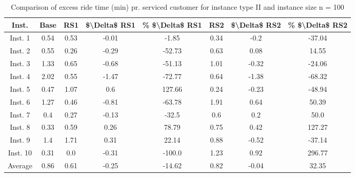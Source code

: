 \begin{table}[H]
\centering
\begin{tabular}{cccccccc}
  \hline
  \textbf{Inst.} & \textbf{Base} & \textbf{RS1} & \textbf{\$\textbackslash{}Delta\$  RS1} & \textbf{\% \$\textbackslash{}Delta\$  RS1} & \textbf{RS2} & \textbf{\$\textbackslash{}Delta\$  RS2} & \textbf{\% \$\textbackslash{}Delta\$  RS2} \\\hline
  Inst. 1 & 0.54 & 0.53 & -0.01 & -1.85 & 0.34 & -0.2 & -37.04 \\
  Inst. 2 & 0.55 & 0.26 & -0.29 & -52.73 & 0.63 & 0.08 & 14.55 \\
  Inst. 3 & 1.33 & 0.65 & -0.68 & -51.13 & 1.01 & -0.32 & -24.06 \\
  Inst. 4 & 2.02 & 0.55 & -1.47 & -72.77 & 0.64 & -1.38 & -68.32 \\
  Inst. 5 & 0.47 & 1.07 & 0.6 & 127.66 & 0.24 & -0.23 & -48.94 \\
  Inst. 6 & 1.27 & 0.46 & -0.81 & -63.78 & 1.91 & 0.64 & 50.39 \\
  Inst. 7 & 0.4 & 0.27 & -0.13 & -32.5 & 0.6 & 0.2 & 50.0 \\
  Inst. 8 & 0.33 & 0.59 & 0.26 & 78.79 & 0.75 & 0.42 & 127.27 \\
  Inst. 9 & 1.4 & 1.71 & 0.31 & 22.14 & 0.88 & -0.52 & -37.14 \\
  Inst. 10 & 0.31 & 0.0 & -0.31 & -100.0 & 1.23 & 0.92 & 296.77 \\
  Average & 0.86 & 0.61 & -0.25 & -14.62 & 0.82 & -0.04 & 32.35 \\\hline
\end{tabular}
\caption{Comparison of excess ride time (min) pr. serviced customer for instance type II and instance size n = 100}
\label{tab:wait:resrelocation-excess-ride-time-comparison_II_100}
\end{table}
